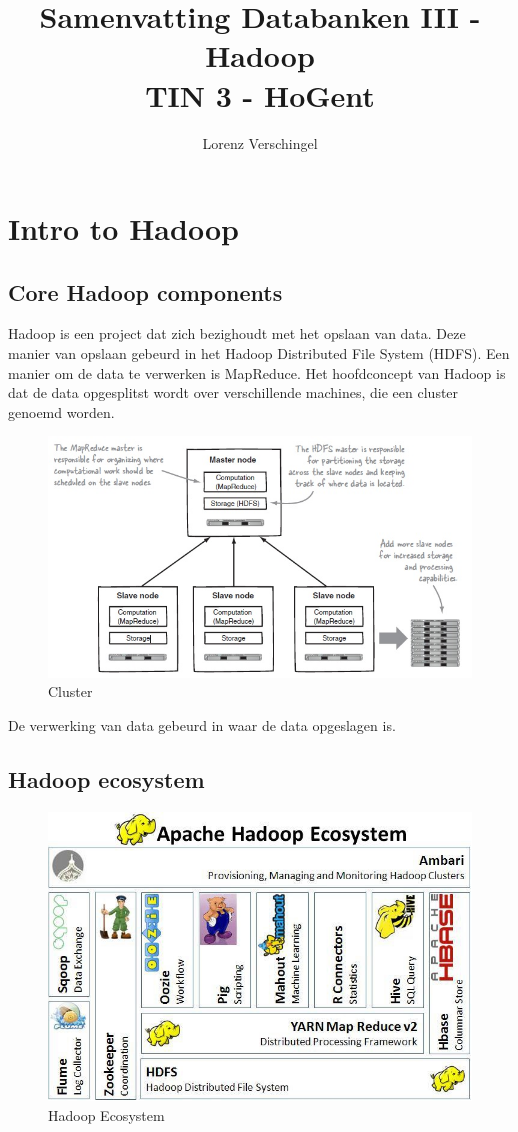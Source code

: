 \documentclass[a4paper,12pt]{article}
\title{Samenvatting Databanken III - Hadoop \\ \large TIN 3 - HoGent}
\author{Lorenz Verschingel}
\begin{document}
\maketitle
\section{Intro to Hadoop}
\subsection{Core Hadoop components}
Hadoop is een project dat zich bezighoudt met het opslaan van data.
Deze manier van opslaan gebeurd in het Hadoop Distributed File System (HDFS).
Een manier om de data te verwerken is MapReduce.
Het hoofdconcept van Hadoop is dat de data opgesplitst wordt over verschillende machines, die een cluster genoemd worden.

\begin{figure}[H]
\centering
\includegraphics[scale=0.75]{img/HadoopCluster.jpg}
\caption{Cluster}
\label{hadoop-cluster}
\end{figure}

De verwerking van data gebeurd in waar de data opgeslagen is.

\subsection{Hadoop ecosystem}

\begin{figure}[H]
\centering
\includegraphics[scale=0.75]{img/HadoopEcosystem.jpg}
\caption{Hadoop Ecosystem}
\label{hadoop-ecosystem}
\end{figure}
\end{document}
